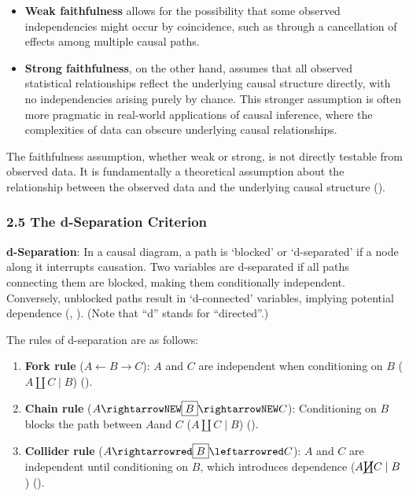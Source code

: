 \documentclass[
  single column]{article}
\providecommand{\tightlist}{%
  \setlength{\itemsep}{0pt}\setlength{\parskip}{0pt}}\usepackage{longtable,booktabs,array}
\begin{document}
\begin{itemize}
\tightlist
\item
  \textbf{Weak faithfulness} allows for the possibility that some
  observed independencies might occur by coincidence, such as through a
  cancellation of effects among multiple causal paths.
\item
  \textbf{Strong faithfulness}, on the other hand, assumes that all
  observed statistical relationships reflect the underlying causal
  structure directly, with no independencies arising purely by chance.
  This stronger assumption is often more pragmatic in real-world
  applications of causal inference, where the complexities of data can
  obscure underlying causal relationships.
\end{itemize}

The faithfulness assumption, whether weak or strong, is not directly
testable from observed data. It is fundamentally a theoretical
assumption about the relationship between the observed data and the
underlying causal structure ().

\subsubsection{2.5 The d-Separation
Criterion}\label{the-d-separation-criterion}

\textbf{d-Separation}: In a causal diagram, a path is `blocked' or
`d-separated' if a node along it interrupts causation. Two variables are
d-separated if all paths connecting them are blocked, making them
conditionally independent. Conversely, unblocked paths result in
`d-connected' variables, implying potential dependence
(, ).
(Note that ``d'' stands for ``directed''.)

The rules of d-separation are as follows:

\begin{enumerate}
\def\labelenumi{\alph{enumi}.}
\item
  \textbf{Fork rule} (\(A \leftarrow \boxed{B} \rightarrow C\)): \(A\)
  and \(C\) are independent when conditioning on \(B\)
  (\(A \coprod C \mid B\)) ().
\item
  \textbf{Chain rule} (\(A \rightarrowNEW \boxed{B} \rightarrowNEW C\)):
  Conditioning on \(B\)blocks the path between \(A\)and \(C\)
  (\(A \coprod C \mid B\)) ().
\item
  \textbf{Collider rule}
  (\(A \rightarrowred \boxed{B} \leftarrowred C\)): \(A\) and \(C\) are
  independent until conditioning on \(B\), which introduces dependence
  (\(A \cancel{\coprod} C \mid B\)) ().
\end{enumerate}
\end{document}
